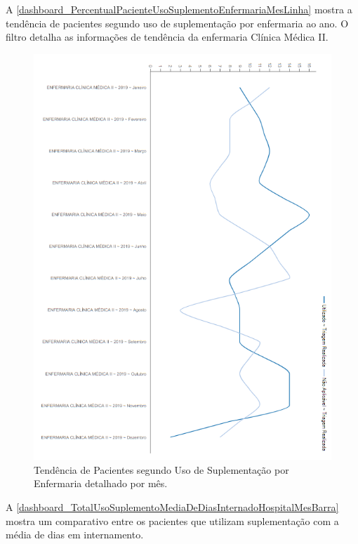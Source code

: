 \newpage
A \autoref{dashboard_PercentualPacienteUsoSuplementoEnfermariaMesLinha} mostra a tendência de pacientes segundo uso de suplementação por enfermaria ao ano.  O filtro detalha as informações de tendência da enfermaria Clínica Médica II.

\begin{figure}[htb]
	\caption{\label{dashboard_PercentualPacienteUsoSuplementoEnfermariaMesLinha}Tendência de Pacientes segundo Uso de Suplementação por Enfermaria detalhado por mês.}
	\begin{center}
	    \includegraphics[scale=0.9]{Imagens/4.4.PercentualPacienteUsoSuplementoEnfermariaMesLinha.png}
	\end{center}
\end{figure}

\newpage
A \autoref{dashboard_TotalUsoSuplementoMediaDeDiasInternadoHospitalMesBarra} mostra um comparativo entre os pacientes que utilizam suplementação com a média de dias em internamento.

